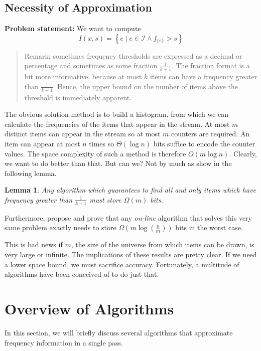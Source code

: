 \documentclass[landscape,twocolumn,a4paper]{article}
\newtheorem{mylemma}{Lemma}
\begin{document}
\subsection{Necessity of Approximation}
\begin{framed}
\textbf{Problem statement:} We want to compute $$I(x, s) = \left\{e \; | \; e \in \mathcal{I} \wedge f_{\{e\}} > s \right\}$$
\end{framed}

\begin{quote}
Remark: sometimes frequency thresholds are expressed as a decimal or percentage and sometimes as some fraction $\frac{1}{k + 1}$. The fraction format is a bit more informative, because at most $k$ items can have a frequency greater than $\frac{1}{k + 1}$. Hence, the upper bound on the number of items above the threshold is immediately apparent.
\end{quote}

The obvious solution method is to build a histogram, from which we can calculate the frequencies of the items that appear in the stream. At most $m$ distinct items can appear in the stream so at most $m$ counters are required. An item can appear at most $n$ times so $\Theta(\log n)$ bits suffice to encode the counter values. The space complexity of such a method is therefore $O(m \log n)$. Clearly, we want to do better than that. But can we? Not by much as \cite{Cormode:2003:WHW:773153.773182} show in the following lemma.

\begin{mylemma}
Any algorithm which guarantees to find all and only items which have frequency greater than $\frac{1}{k + 1}$ must store $\Omega(m)$ bits.
\end{mylemma}

Furthermore, \cite{Karp:2003:SAF:762471.762473} propose and prove that any \textit{on-line} algorithm that solves this very same problem exactly needs to store $\Omega(m \log (\frac{n}{m}))$ bits in the worst case.

This is bad news if $m$, the size of the universe from which items can be drawn, is very large or infinite. The implications of these results are pretty clear. If we need a lower space bound, we must sacrifice accuracy. Fortunately, a multitude of algorithms have been conceived of to do just that.

\section{Overview of Algorithms}
In this section, we will briefly discuss several algorithms that approximate frequency information in a single pass.
\end{document}

